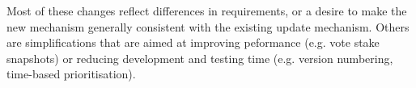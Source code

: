 Most of these changes reflect differences in requirements, or a desire to make
the new mechanism generally consistent with the existing update mechanism.
Others are simplifications that are aimed at improving peformance (e.g. vote
stake snapshots) or reducing development and testing time (e.g. version numbering, time-based prioritisation).

